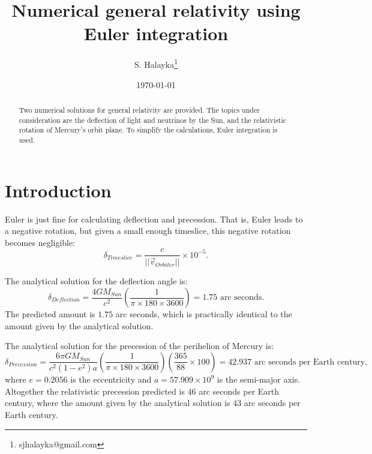 \documentclass[12pt]{article}
\title{Numerical general relativity using Euler integration}
\author{S. Halayka\footnote{sjhalayka@gmail.com}}
\date{\today\;\currenttime}
\begin{document}
 
\maketitle

\begin{abstract}
Two numerical solutions for general relativity are provided.
The topics under consideration are the deflection of light and neutrinos by the Sun, and the relativistic rotation of Mercury's orbit plane.
To simplify the calculations, Euler integration is used.
\end{abstract}





\section{Introduction}



Euler is just fine for calculating deflection and precession.
That is, Euler leads to a negative rotation, but given a small enough timeslice, this negative rotation becomes negligible:
\begin{equation}
\delta_{Timeslice} = \frac{c}{\lvert\lvert \vec{v}_{Orbiter} \rvert \rvert} \times 10^{-5}.
\end{equation}







The analytical solution for the deflection angle is:
\begin{equation}
\delta_{Deflection} = \frac{4GM_{Sun}}{c^2} \left( \frac{1}{\pi \times 180 \times 3600} \right) = 1.75 \textrm{ arc seconds}.
\end{equation}
The predicted amount is $1.75$ arc seconds, which is practically identical to the amount given by the analytical solution.




The analytical solution for the precession of the perihelion of Mercury is:
\begin{equation}
\delta_{Precession} = \frac{6 \pi GM_{Sun}}{c^2 (1 - e^2) a} \left( \frac{1}{ \pi \times 180 \times 3600} \right) \left( \frac{365}{88} \times 100 \right) = 42.937 \textrm{ arc seconds per Earth century},
\end{equation}
where $e = 0.2056$ is the eccentricity and $a = 57.909 \times 10^9$ is the semi-major axis.
Altogether the relativistic precession predicted is $46$ arc seconds per Earth century, where the amount given by the analytical solution is $43$ arc seconds per Earth century.
\end{document}
